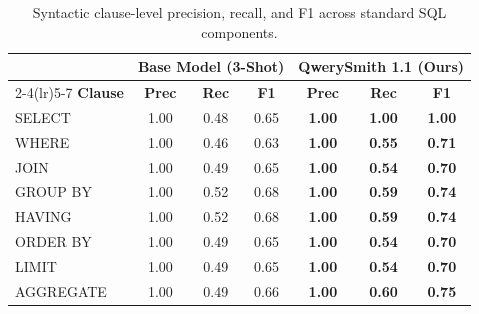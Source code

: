 \begin{table}[t]
\centering\small
\begin{tabular}{lcccccc}
\toprule
 & \multicolumn{3}{c}{\textbf{Base Model (3-Shot)}} & \multicolumn{3}{c}{\textbf{QwerySmith 1.1 (Ours)}} \\
\cmidrule(lr){2-4}\cmidrule(lr){5-7}
\textbf{Clause} & \textbf{Prec} & \textbf{Rec} & \textbf{F1} & \textbf{Prec} & \textbf{Rec} & \textbf{F1} \\
\midrule
SELECT & 1.00 & 0.48 & 0.65 & \textbf{1.00} & \textbf{1.00} & \textbf{1.00} \\
WHERE & 1.00 & 0.46 & 0.63 & \textbf{1.00} & \textbf{0.55} & \textbf{0.71} \\
JOIN & 1.00 & 0.49 & 0.65 & \textbf{1.00} & \textbf{0.54} & \textbf{0.70} \\
GROUP BY & 1.00 & 0.52 & 0.68 & \textbf{1.00} & \textbf{0.59} & \textbf{0.74} \\
HAVING & 1.00 & 0.52 & 0.68 & \textbf{1.00} & \textbf{0.59} & \textbf{0.74} \\
ORDER BY & 1.00 & 0.49 & 0.65 & \textbf{1.00} & \textbf{0.54} & \textbf{0.70} \\
LIMIT & 1.00 & 0.49 & 0.65 & \textbf{1.00} & \textbf{0.54} & \textbf{0.70} \\
AGGREGATE & 1.00 & 0.49 & 0.66 & \textbf{1.00} & \textbf{0.60} & \textbf{0.75} \\
\bottomrule
\end{tabular}
\caption{Syntactic clause-level precision, recall, and F1 across standard SQL components.}
\label{tab:clause_metrics}
\end{table}
